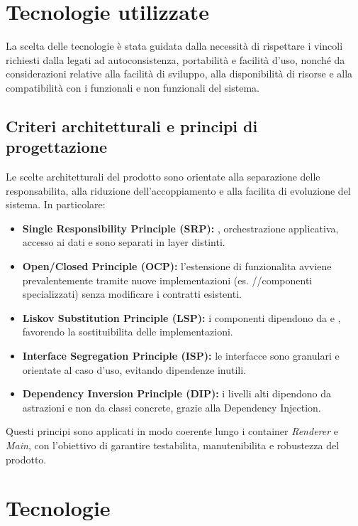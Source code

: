 \newpage
\section{Tecnologie utilizzate}
La scelta delle tecnologie è stata guidata dalla necessità di rispettare i
vincoli richiesti dalla  legati ad autoconsistenza, portabilità e
facilità d'uso, nonché da considerazioni relative alla facilità di sviluppo,
alla disponibilità di risorse e alla compatibilità con i  funzionali e
non funzionali del sistema.\\

\subsection{Criteri architetturali e principi di progettazione}
Le scelte architetturali del prodotto sono orientate alla separazione delle responsabilita,
alla riduzione dell'accoppiamento e alla facilita di evoluzione del sistema.
In particolare:
\begin{itemize}
      \item \textbf{Single Responsibility Principle (SRP):} , orchestrazione applicativa, accesso ai dati e  sono separati in layer distinti.
      \item \textbf{Open/Closed Principle (OCP):} l'estensione di funzionalita avviene prevalentemente tramite nuove implementazioni (es. //componenti specializzati) senza modificare i contratti esistenti.
      \item \textbf{Liskov Substitution Principle (LSP):} i componenti dipendono da  e , favorendo la sostituibilita delle implementazioni.
      \item \textbf{Interface Segregation Principle (ISP):} le interfacce sono granulari e orientate al caso d'uso, evitando dipendenze inutili.
      \item \textbf{Dependency Inversion Principle (DIP):} i livelli alti dipendono da astrazioni e non da classi concrete, grazie alla Dependency Injection.
\end{itemize}
Questi principi sono applicati in modo coerente lungo i container \textit{Renderer} e \textit{Main},
con l'obiettivo di garantire testabilita, manutenibilita e robustezza del prodotto.

\section{Tecnologie}
